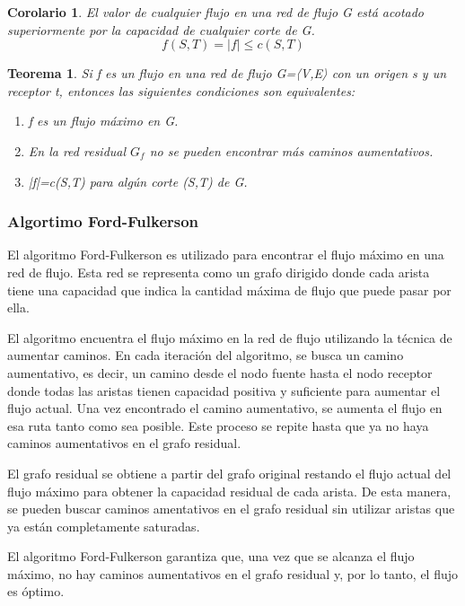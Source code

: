 \documentclass[10pt]{article} %
\newtheorem{thm}{Teorema}
\newtheorem{col}{Corolario}
\begin{document}
	\begin{col}
		El valor de cualquier flujo en una red de flujo G está acotado superiormente por la capacidad de cualquier corte de G.
		\begin{equation}
			f(S,T) = |f| \leq c(S,T)
		\end{equation}
	\end{col}
	
	\begin{thm}
		Si f es un flujo en una red de flujo G=〈V,E〉 con un origen s y un receptor t, entonces las siguientes condiciones son equivalentes:
		\begin{enumerate}
			\item f es un flujo máximo en G. 
			\item En la red residual $G_f$ no se pueden encontrar más caminos aumentativos.
			\item  |f|=c(S,T) para algún corte (S,T) de G.
		\end{enumerate}
	\end{thm}

		\subsubsection{Algortimo Ford-Fulkerson}
	
	El algoritmo Ford-Fulkerson es utilizado para encontrar el flujo máximo en una red de flujo. Esta red se representa como un grafo dirigido donde cada arista tiene una capacidad que indica la cantidad máxima de flujo que puede pasar por ella.
	
	El algoritmo encuentra el flujo máximo en la red de flujo utilizando la técnica de aumentar caminos. En cada iteración del algoritmo, se busca un camino aumentativo, es decir, un camino desde el nodo fuente hasta el nodo receptor donde todas las aristas tienen capacidad positiva y suficiente para aumentar el flujo actual. Una vez encontrado el camino aumentativo, se aumenta el flujo en esa ruta tanto como sea posible. Este proceso se repite hasta que ya no haya caminos aumentativos en el grafo residual.
	
	El grafo residual se obtiene a partir del grafo original restando el flujo actual del flujo máximo para obtener la capacidad residual de cada arista. De esta manera, se pueden buscar caminos amentativos en el grafo residual sin utilizar aristas que ya están completamente saturadas.
	
	El algoritmo Ford-Fulkerson garantiza que, una vez que se alcanza el flujo máximo, no hay caminos aumentativos en el grafo residual y, por lo tanto, el flujo es óptimo.
	
\end{document}
